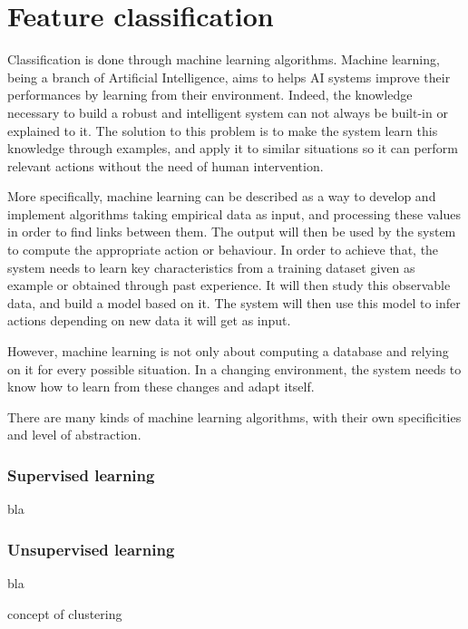 \chapter{Feature classification}
\label{chap:classification}

\noindent Classification is done through machine learning algorithms. Machine learning, being a branch of Artificial Intelligence, aims to helps AI systems improve their performances by learning from their environment. Indeed, the knowledge necessary to build a robust and intelligent system can not always be built-in or explained to it. The solution to this problem is to make the system learn this knowledge through examples, and apply it to similar situations so it can perform relevant actions without the need of human intervention. 
\newline

\noindent More specifically, machine learning can be described as a way to develop and implement algorithms taking empirical data as input, and processing these values in order to find links between them. The output will then be used by the system to compute the appropriate action or behaviour. In order to achieve that, the system needs to learn key characteristics from a training dataset given as example or obtained through past experience. It will then study this observable data, and build a model based on it. The system will then use this model to infer actions depending on new data it will get as input.
\newline

\noindent However, machine learning is not only about computing a database and relying on it for every possible situation. In a changing environment, the system needs to know how to learn from these changes and adapt itself.
\newline

\noindent There are many kinds of machine learning algorithms, with their own specificities and level of abstraction.
\newline

\subsection{Supervised learning}

\vspace{\baselineskip}
\noindent bla
\newline

\subsection{Unsupervised learning}

\vspace{\baselineskip}
\noindent bla
\newline

\noindent concept of clustering
\newline


